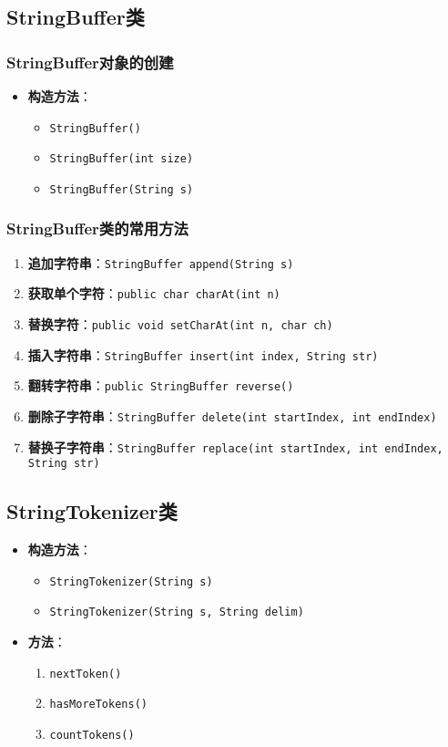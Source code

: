 \documentclass[a4paper, 10pt]{ctexart}
\begin{document}
\subsection{StringBuffer类}
\subsubsection{StringBuffer对象的创建}
\begin{itemize}
  \item \textbf{构造方法}：
  \begin{itemize}
    \item \texttt{StringBuffer()}
    \item \texttt{StringBuffer(int size)}
    \item \texttt{StringBuffer(String s)}
  \end{itemize}
\end{itemize}

\subsubsection{StringBuffer类的常用方法}
\begin{enumerate}
  \item \textbf{追加字符串}：\texttt{StringBuffer append(String s)}
  \item \textbf{获取单个字符}：\texttt{public char charAt(int n)}
  \item \textbf{替换字符}：\texttt{public void setCharAt(int n, char ch)}
  \item \textbf{插入字符串}：\texttt{StringBuffer insert(int index, String str)}
  \item \textbf{翻转字符串}：\texttt{public StringBuffer reverse()}
  \item \textbf{删除子字符串}：\texttt{StringBuffer delete(int startIndex, int endIndex)}
  \item \textbf{替换子字符串}：\texttt{StringBuffer replace(int startIndex, int endIndex, String str)}
\end{enumerate}

\subsection{StringTokenizer类}
\begin{itemize}
  \item \textbf{构造方法}：
  \begin{itemize}
    \item \texttt{StringTokenizer(String s)}
    \item \texttt{StringTokenizer(String s, String delim)}
  \end{itemize}
  \item \textbf{方法}：
  \begin{enumerate}
    \item \texttt{nextToken()}
    \item \texttt{hasMoreTokens()}
    \item \texttt{countTokens()}
  \end{enumerate}
\end{itemize}
\end{document}
